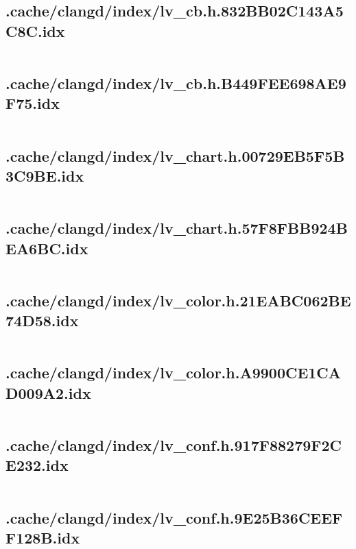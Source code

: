 \subsection{.cache/clangd/index/lv_cb.h.832BB02C143A5C8C.idx}
\inputminted[linenos,tabsize=2,breaklines, breakanywhere]{c}{lv_cb.h.832BB02C143A5C8C.idx}
\pagebreak

\subsection{.cache/clangd/index/lv_cb.h.B449FEE698AE9F75.idx}
\inputminted[linenos,tabsize=2,breaklines, breakanywhere]{c}{lv_cb.h.B449FEE698AE9F75.idx}
\pagebreak

\subsection{.cache/clangd/index/lv_chart.h.00729EB5F5B3C9BE.idx}
\inputminted[linenos,tabsize=2,breaklines, breakanywhere]{c}{lv_chart.h.00729EB5F5B3C9BE.idx}
\pagebreak

\subsection{.cache/clangd/index/lv_chart.h.57F8FBB924BEA6BC.idx}
\inputminted[linenos,tabsize=2,breaklines, breakanywhere]{c}{lv_chart.h.57F8FBB924BEA6BC.idx}
\pagebreak

\subsection{.cache/clangd/index/lv_color.h.21EABC062BE74D58.idx}
\inputminted[linenos,tabsize=2,breaklines, breakanywhere]{c}{lv_color.h.21EABC062BE74D58.idx}
\pagebreak

\subsection{.cache/clangd/index/lv_color.h.A9900CE1CAD009A2.idx}
\inputminted[linenos,tabsize=2,breaklines, breakanywhere]{c}{lv_color.h.A9900CE1CAD009A2.idx}
\pagebreak

\subsection{.cache/clangd/index/lv_conf.h.917F88279F2CE232.idx}
\inputminted[linenos,tabsize=2,breaklines, breakanywhere]{c}{lv_conf.h.917F88279F2CE232.idx}
\pagebreak

\subsection{.cache/clangd/index/lv_conf.h.9E25B36CEEFF128B.idx}
\inputminted[linenos,tabsize=2,breaklines, breakanywhere]{c}{lv_conf.h.9E25B36CEEFF128B.idx}
\pagebreak

